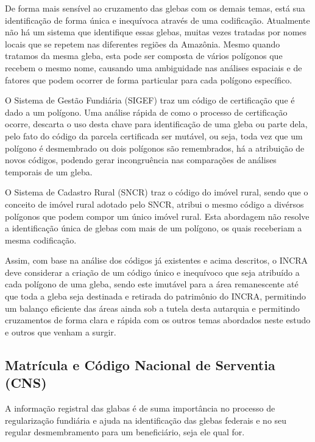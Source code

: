 \documentclass[
  letterpaper,
]{report}
\begin{document}
De forma mais sensível ao cruzamento das glebas com os demais temas,
está sua identificação de forma única e inequívoca através de uma
codificação. Atualmente não há um sistema que identifique essas glebas,
muitas vezes tratadas por nomes locais que se repetem nas diferentes
regiões da Amazônia. Mesmo quando tratamos da mesma gleba, esta pode ser
composta de vários polígonos que recebem o mesmo nome, causando uma
ambiguidade nas análises espaciais e de fatores que podem ocorrer de
forma particular para cada polígono específico.

O Sistema de Gestão Fundiária (SIGEF) traz um código de certificação que
é dado a um polígono. Uma análise rápida de como o processo de
certificação ocorre, descarta o uso desta chave para identificação de
uma gleba ou parte dela, pelo fato do código da parcela certificada ser
mutável, ou seja, toda vez que um polígono é desmembrado ou dois
polígonos são remembrados, há a atribuição de novos códigos, podendo
gerar incongruência nas comparações de análises temporais de um gleba.

O Sistema de Cadastro Rural (SNCR) traz o código do imóvel rural, sendo
que o conceito de imóvel rural adotado pelo SNCR, atribui o mesmo código
a divérsos polígonos que podem compor um único imóvel rural. Esta
abordagem não resolve a identificação única de glebas com mais de um
polígono, os quais receberiam a mesma codificação.

Assim, com base na análise dos códigos já existentes e acima descritos,
o INCRA deve considerar a criação de um código único e inequívoco que
seja atribuído a cada polígono de uma gleba, sendo este imutável para a
área remanescente até que toda a gleba seja destinada e retirada do
patrimônio do INCRA, permitindo um balanço eficiente das áreas ainda sob
a tutela desta autarquia e permitindo cruzamentos de forma clara e
rápida com os outros temas abordados neste estudo e outros que venham a
surgir.

\hypertarget{matruxedcula-e-cuxf3digo-nacional-de-serventia-cns}{%
\subsection{Matrícula e Código Nacional de Serventia
(CNS)}\label{matruxedcula-e-cuxf3digo-nacional-de-serventia-cns}}

A informação registral das glabas é de suma importância no processo de
regularização fundiária e ajuda na identificação das glebas federais e
no seu regular desmembramento para um beneficiário, seja ele qual for.
\end{document}
